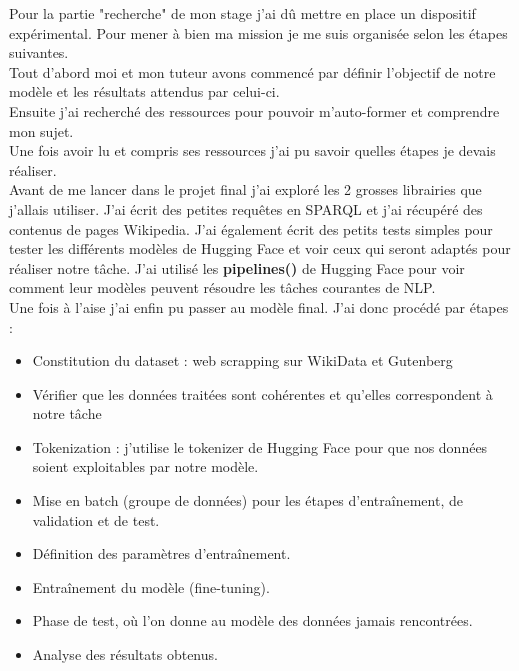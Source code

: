 \documentclass[12pt]{article}
\begin{document}
Pour la partie "recherche" de mon stage j'ai dû mettre en place un dispositif expérimental. Pour mener à bien ma mission je me suis organisée selon les étapes suivantes. \\
Tout d'abord moi et mon tuteur avons commencé par définir l'objectif de notre modèle et les résultats attendus par celui-ci. \\
Ensuite j'ai recherché des ressources pour pouvoir m'auto-former et comprendre mon sujet. \\
Une fois avoir lu et compris ses ressources j'ai pu savoir quelles étapes je devais réaliser. \\
Avant de me lancer dans le projet final j'ai exploré les 2 grosses librairies que j'allais utiliser. J'ai écrit des petites requêtes en SPARQL et j'ai récupéré des contenus de pages Wikipedia. J'ai également  écrit des petits tests simples pour tester les différents modèles de Hugging Face et voir ceux qui seront adaptés pour réaliser notre tâche. J'ai utilisé les \textbf{pipelines()} de Hugging Face pour voir comment leur modèles peuvent résoudre les tâches courantes de NLP. \\
Une fois à l'aise j'ai enfin pu passer au modèle final. J'ai donc procédé par étapes :

\begin{itemize}
    \item Constitution du dataset : web scrapping sur WikiData et Gutenberg
    
    \item Vérifier que les données traitées sont cohérentes et qu'elles correspondent à notre tâche
    
    \item Tokenization : j'utilise le tokenizer de Hugging Face pour que nos données soient exploitables par notre modèle. 
    
    \item Mise en batch (groupe de données) pour les étapes d'entraînement, de validation et de test.
    
    \item Définition des paramètres d'entraînement. 
    
    \item Entraînement du modèle (fine-tuning).
    
    \item Phase de test, où l'on donne au modèle des données jamais rencontrées.
    
    \item Analyse des résultats obtenus. 
    
\end{itemize}
\end{document}
